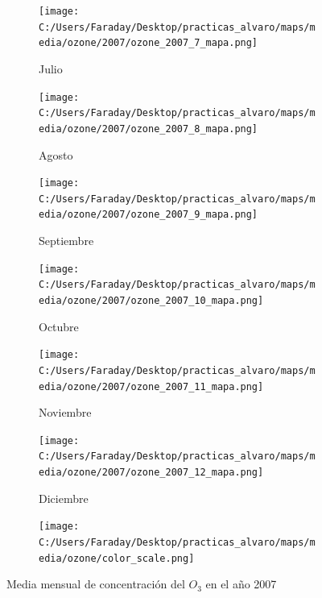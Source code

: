 \documentclass[12pt]{article}
\begin{document}
\begin{figure}[H]
\begin{subfigure}[H]{0.15\textwidth}
\texttt{[image: C:/Users/Faraday/Desktop/practicas\_alvaro/maps/media/ozone/2007/ozone\_2007\_7\_mapa.png]}
\captionsetup{labelformat=empty}
\caption{Julio}
\label{fig:map-ozone-2007-7}
\end{subfigure}
%
\begin{subfigure}[H]{0.15\textwidth}
\texttt{[image: C:/Users/Faraday/Desktop/practicas\_alvaro/maps/media/ozone/2007/ozone\_2007\_8\_mapa.png]}
\captionsetup{labelformat=empty}
\caption{Agosto}
\label{fig:map-ozone-2007-8}
\end{subfigure}
%
\begin{subfigure}[H]{0.15\textwidth}
\texttt{[image: C:/Users/Faraday/Desktop/practicas\_alvaro/maps/media/ozone/2007/ozone\_2007\_9\_mapa.png]}
\captionsetup{labelformat=empty}
\caption{Septiembre}
\label{fig:map-ozone-2007-9}
\end{subfigure}
%
\begin{subfigure}[H]{0.15\textwidth}
\texttt{[image: C:/Users/Faraday/Desktop/practicas\_alvaro/maps/media/ozone/2007/ozone\_2007\_10\_mapa.png]}
\captionsetup{labelformat=empty}
\caption{Octubre}
\label{fig:map-ozone-2007-10}
\end{subfigure}
%
\begin{subfigure}[H]{0.15\textwidth}
\texttt{[image: C:/Users/Faraday/Desktop/practicas\_alvaro/maps/media/ozone/2007/ozone\_2007\_11\_mapa.png]}
\captionsetup{labelformat=empty}
\caption{Noviembre}
\label{fig:map-ozone-2007-11}
\end{subfigure}
%
\begin{subfigure}[H]{0.15\textwidth}
\texttt{[image: C:/Users/Faraday/Desktop/practicas\_alvaro/maps/media/ozone/2007/ozone\_2007\_12\_mapa.png]}
\captionsetup{labelformat=empty}
\caption{Diciembre}
\label{fig:map-ozone-2007-12}
\end{subfigure}

\begin{subfigure}[H]{0.45\textwidth}
\texttt{[image: C:/Users/Faraday/Desktop/practicas\_alvaro/maps/media/ozone/color\_scale.png]}
\captionsetup{labelformat=empty}
\caption{}
\end{subfigure}

\vspace*{-7mm}
\caption{Media mensual de concentración del $O_{3}$ en el año 2007}
\label{fig:map-ozone-2007}
\end{figure}
\end{document}
